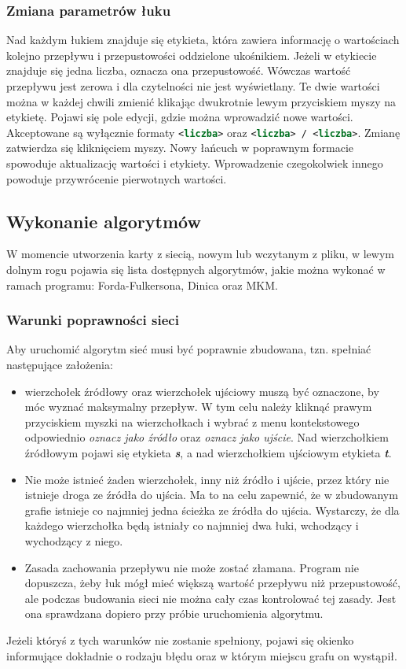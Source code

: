 \subsubsection{Zmiana parametrów łuku}
Nad każdym łukiem znajduje się etykieta, która zawiera informację o wartościach kolejno przepływu i przepustowości oddzielone ukośnikiem. Jeżeli w etykiecie znajduje się jedna liczba, oznacza ona przepustowość. Wówczas wartość przepływu jest zerowa i dla czytelności nie jest wyświetlany. Te dwie wartości można w każdej chwili zmienić klikając dwukrotnie lewym przyciskiem myszy na etykietę. Pojawi się pole edycji, gdzie można wprowadzić nowe wartości. Akceptowane są wyłącznie formaty \lstinline[language=xml]|<liczba>| oraz  \lstinline[language=xml]|<liczba> / <liczba>|. Zmianę zatwierdza się kliknięciem myszy. Nowy łańcuch w poprawnym formacie spowoduje aktualizację wartości i etykiety. Wprowadzenie czegokolwiek innego powoduje przywrócenie pierwotnych wartości.
\subsection{Wykonanie algorytmów}
W momencie utworzenia karty z siecią, nowym lub wczytanym z pliku, w lewym dolnym rogu pojawia się lista dostępnych algorytmów, jakie można wykonać w ramach programu: Forda-Fulkersona, Dinica oraz MKM.
\subsubsection{Warunki poprawności sieci}
Aby uruchomić algorytm sieć musi być poprawnie zbudowana, tzn. spełniać następujące założenia:
\begin{itemize}
	\item wierzchołek źródłowy oraz wierzchołek ujściowy muszą być oznaczone, by móc wyznać maksymalny przepływ. W tym celu należy kliknąć prawym przyciskiem myszki na wierzchołkach i wybrać z menu kontekstowego odpowiednio \textit{oznacz jako źródło} oraz \textit{oznacz jako ujście}. Nad wierzchołkiem źródłowym pojawi się etykieta \textit{\textbf{s}}, a nad wierzchołkiem ujściowym etykieta \textit{\textbf{t}}.
	\item Nie może istnieć żaden wierzchołek, inny niż źródło i ujście, przez który nie istnieje droga ze źródła do ujścia. Ma to na celu zapewnić, że w zbudowanym grafie istnieje co najmniej jedna ścieżka ze źródła do ujścia. Wystarczy, że dla każdego wierzchołka będą istniały co najmniej dwa łuki, wchodzący i wychodzący z niego.
	\item Zasada zachowania przepływu nie może zostać złamana. Program nie dopuszcza, żeby łuk mógł mieć większą wartość przepływu niż przepustowość, ale podczas budowania sieci nie można cały czas kontrolować tej zasady. Jest ona sprawdzana dopiero przy próbie uruchomienia algorytmu.
\end{itemize}
Jeżeli któryś z tych warunków nie zostanie spełniony, pojawi się okienko informujące dokładnie o rodzaju błędu oraz w którym miejscu grafu on wystąpił.
